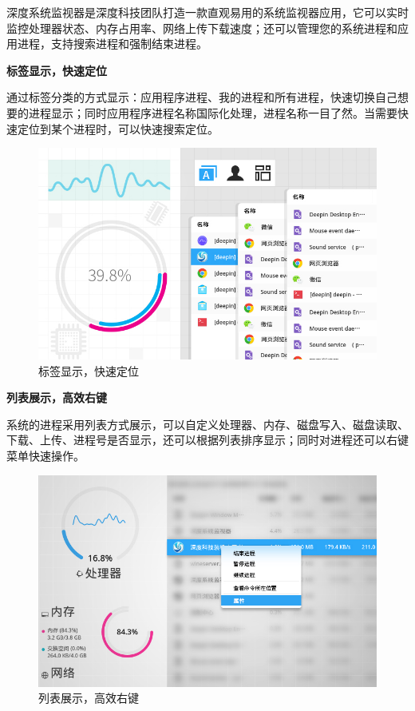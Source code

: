 \documentclass[doctor,openright,twoside]{sjtuthesis}
\theoremstyle{plain}
\theoremstyle{definition}
\theoremstyle{remark}
\theoremstyle{ocrenumbox}
\theoremstyle{plain}
\begin{document}
深度系统监视器是深度科技团队打造一款直观易用的系统监视器应用，它可以实时监控处理器状态、内存占用率、网络上传下载速度；还可以管理您的系统进程和应用进程，支持搜索进程和强制结束进程。

\textbf{标签显示，快速定位}

通过标签分类的方式显示：应用程序进程、我的进程和所有进程，快速切换自己想要的进程显示；同时应用程序进程名称国际化处理，进程名称一目了然。当需要快速定位到某个进程时，可以快速搜索定位。

\begin{figure}
\centering
\includegraphics{images/deepin-system-monitor-3.jpg}
\caption{标签显示，快速定位}
\end{figure}

\textbf{列表展示，高效右键}

系统的进程采用列表方式展示，可以自定义处理器、内存、磁盘写入、磁盘读取、下载、上传、进程号是否显示，还可以根据列表排序显示；同时对进程还可以右键菜单快速操作。

\begin{figure}
\centering
\includegraphics{images/deepin-system-monitor-4.jpg}
\caption{列表展示，高效右键}
\end{figure}
\end{document}
